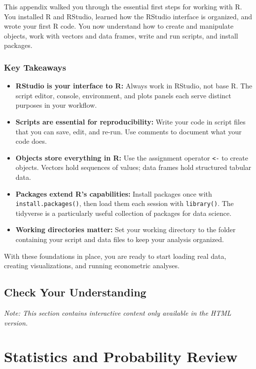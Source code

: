 \documentclass[
  letterpaper,
  DIV=11,
  numbers=noendperiod]{scrreprt}
\begin{document}
This appendix walked you through the essential first steps for working
with R. You installed R and RStudio, learned how the RStudio interface
is organized, and wrote your first R code. You now understand how to
create and manipulate objects, work with vectors and data frames, write
and run scripts, and install packages.

\subsection{Key Takeaways}\label{key-takeaways-5}

\begin{itemize}
\item
  \textbf{RStudio is your interface to R:} Always work in RStudio, not
  base R. The script editor, console, environment, and plots panels each
  serve distinct purposes in your workflow.
\item
  \textbf{Scripts are essential for reproducibility:} Write your code in
  script files that you can save, edit, and re-run. Use comments to
  document what your code does.
\item
  \textbf{Objects store everything in R:} Use the assignment operator
  \texttt{\textless{}-} to create objects. Vectors hold sequences of
  values; data frames hold structured tabular data.
\item
  \textbf{Packages extend R's capabilities:} Install packages once with
  \texttt{install.packages()}, then load them each session with
  \texttt{library()}. The tidyverse is a particularly useful collection
  of packages for data science.
\item
  \textbf{Working directories matter:} Set your working directory to the
  folder containing your script and data files to keep your analysis
  organized.
\end{itemize}

With these foundations in place, you are ready to start loading real
data, creating visualizations, and running econometric analyses.

\section{Check Your Understanding}\label{check-your-understanding-13}

\emph{Note: This section contains interactive content only available in
the HTML version.}

\chapter{Statistics and Probability Review}\label{sec-stats-review}
\end{document}

